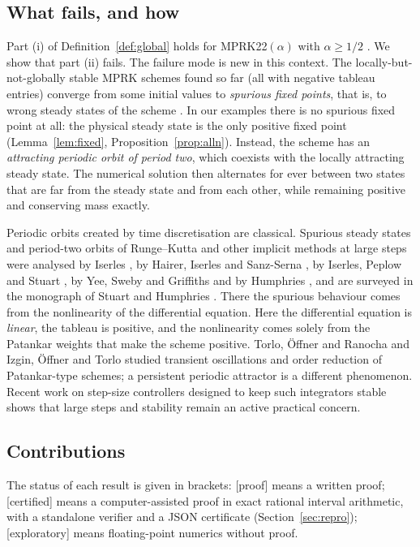 \documentclass[11pt,a4paper]{article}
\theoremstyle{plain}
\theoremstyle{definition}
\newcommand{\status}[1]{\textsf{[#1]}}
\begin{document}
\subsection{What fails, and how}

Part (i) of Definition~\ref{def:global} holds for MPRK22$(\alpha)$ with $\alpha\ge1/2$ \cite{IKM2022a,IKM2022b}. We show that part (ii) fails. The failure mode is new in this context. The locally-but-not-globally stable MPRK schemes found so far (all with negative tableau entries) converge from some initial values to \emph{spurious fixed points}, that is, to wrong steady states of the scheme \cite{IKMS2024}. In our examples there is no spurious fixed point at all: the physical steady state is the only positive fixed point (Lemma~\ref{lem:fixed}, Proposition~\ref{prop:alln}). Instead, the scheme has an \emph{attracting periodic orbit of period two}, which coexists with the locally attracting steady state. The numerical solution then alternates for ever between two states that are far from the steady state and from each other, while remaining positive and conserving mass exactly.

Periodic orbits created by time discretisation are classical. Spurious steady states and period-two orbits of Runge--Kutta and other implicit methods at large steps were analysed by Iserles \cite{Iserles1990}, by Hairer, Iserles and Sanz-Serna \cite{HIS1990}, by Iserles, Peplow and Stuart \cite{IPS1991}, by Yee, Sweby and Griffiths \cite{YSG1991} and by Humphries \cite{Humphries1993}, and are surveyed in the monograph of Stuart and Humphries \cite{SH1996}. There the spurious behaviour comes from the nonlinearity of the differential equation. Here the differential equation is \emph{linear}, the tableau is positive, and the nonlinearity comes solely from the Patankar weights that make the scheme positive. Torlo, \"Offner and Ranocha \cite{TOR2022} and Izgin, \"Offner and Torlo \cite{IOT2024} studied transient oscillations and order reduction of Patankar-type schemes; a persistent periodic attractor is a different phenomenon. Recent work on step-size controllers designed to keep such integrators stable \cite{IR2026} shows that large steps and stability remain an active practical concern.

\subsection{Contributions}

The status of each result is given in brackets: \status{proof} means a written proof; \status{certified} means a computer-assisted proof in exact rational interval arithmetic, with a standalone verifier and a JSON certificate (Section~\ref{sec:repro}); \status{exploratory} means floating-point numerics without proof.
\end{document}
